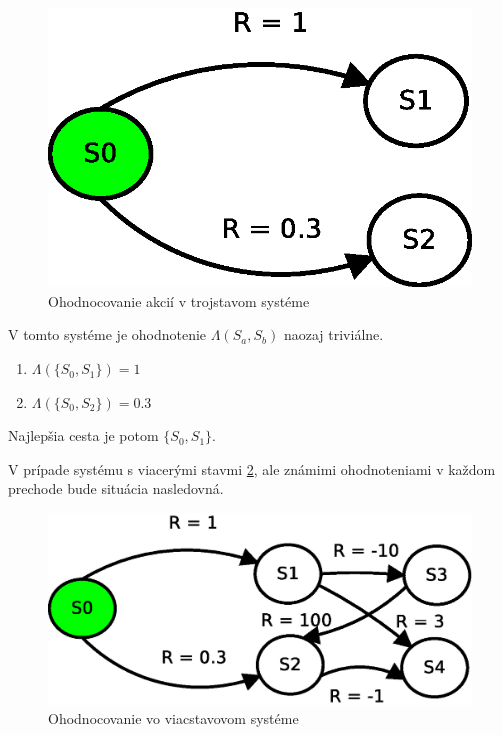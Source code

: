 \begin{figure}[!htb]
\centering
\includegraphics[scale=.6]{../diagrams/rf_two_states.eps}
\caption{Ohodnocovanie akcií v trojstavom systéme}
\label{img:three_states_system}
\end{figure}

V tomto systéme je ohodnotenie $\Lambda(S_a, S_b)$ naozaj triviálne.

\begin{enumerate}
  \item $\Lambda(\{S_0, S_1\}) = 1$
  \item $\Lambda(\{S_0, S_2\}) = 0.3$
\end{enumerate}

Najlepšia cesta je potom $\{S_0, S_1\}$.

V prípade systému s viacerými stavmi \ref{img:multiple_states_system}, ale
známimi ohodnoteniami v každom prechode bude situácia nasledovná.

\begin{figure}[!htb]
\centering
\includegraphics[scale=.6]{../diagrams/rf_more_states.eps}
\caption{Ohodnocovanie vo viacstavovom systéme}
\label{img:multiple_states_system}
\end{figure}

